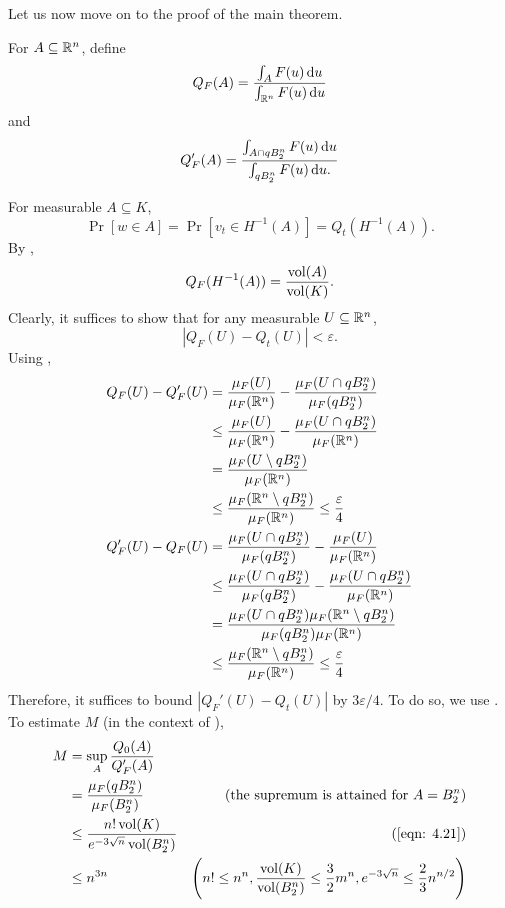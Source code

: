 Let us now move on to the proof of the main theorem.

For $A\subseteq\mathbb{R}^n$, define
\[ Q_F(A) = \frac{\int_A F(u)\operatorname{d}\!{u}}{\int_{\mathbb{R}^n} F(u)\operatorname{d}\!{u}} \]
and
\[ Q_F'(A) = \frac{\int_{A\cap qB_2^n} F(u)\operatorname{d}\!{u}}{\int_{qB_2^n} F(u)\operatorname{d}\!{u}. } \]

For measurable $A\subseteq K$,
\[ \Pr[w\in A] = \Pr[v_t \in H^{-1}(A)] = Q_t(H^{-1}(A)). \]
By ,
\[ Q_F(H^{-1}(A)) = \frac{\operatorname{vol}(A)}{\operatorname{vol}(K)}. \]
Clearly, it suffices to show that for any measurable $U\subseteq\mathbb{R}^n$,
\[ |Q_F(U) - Q_t(U)| < \varepsilon. \]
Using ,
\begin{align*}
	Q_F(U) - Q_F'(U) &= \frac{\mu_F(U)}{\mu_F(\mathbb{R}^n)} - \frac{\mu_F(U\cap q B_2^n)}{\mu_F(q B_2^n)}  \\
		&\leq \frac{\mu_F(U)}{\mu_F(\mathbb{R}^n)} - \frac{\mu_F(U\cap q B_2^n)}{\mu_F(\mathbb{R}^n)} \\
		&= \frac{\mu_F(U\setminus qB_2^n)}{\mu_F(\mathbb{R}^n)} \\
		&\leq \frac{\mu_F(\mathbb{R}^n\setminus qB_2^n)}{\mu_F(\mathbb{R}^n)} \leq \frac{\varepsilon}{4} \\
	Q_F'(U) - Q_F(U) &= \frac{\mu_F(U\cap q B_2^n)}{\mu_F(q B_2^n)} - \frac{\mu_F(U)}{\mu_F(\mathbb{R}^n)} \\
		&\leq \frac{\mu_F(U\cap q B_2^n)}{\mu_F(qB_2^n)} - \frac{\mu_F(U\cap q B_2^n)}{\mu_F(\mathbb{R}^n)} \\
		&= \frac{\mu_F(U\cap q B_2^n)\mu_F(\mathbb{R}^n\setminus qB_2^n)}{\mu_F(qB_2^n)\mu_F(\mathbb{R}^n)} \\
		&\leq \frac{\mu_F(\mathbb{R}^n\setminus qB_2^n)}{\mu_F(\mathbb{R}^n)} \leq \frac{\varepsilon}{4}
\end{align*}
Therefore, it suffices to bound $|Q_F'(U)-Q_t(U)|$ by $3\varepsilon/4$. To do so, we use .
To estimate $M$ (in the context of ),
\begin{align*}
	M 	&= \sup_{A} \frac{Q_0(A)}{Q_F'(A)} \\
		&= \frac{\mu_F(q B_2^n)}{\mu_F(B_2^n)} & (\text{the supremum is attained for }A=B_2^n) \\
		&\leq \frac{n!\vol(K)}{e^{-3\sqrt{n}}\vol(B_2^n)} & (\text{\Cref{eqn: 4.21}}) \\
		&\leq n^{3n} & \left(n!\leq n^n, \frac{\vol(K)}{\vol(B_2^n)} \leq \frac{3}{2}m^n, e^{-3\sqrt{n}}\leq\frac{2}{3}n^{n/2}\right)
\end{align*}

